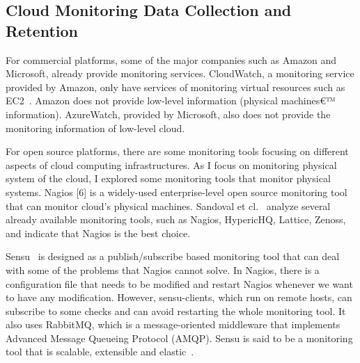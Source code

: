 \subsection{Cloud Monitoring Data Collection and Retention}

For commercial platforms, some of the major companies such as Amazon and Microsoft, already provide monitoring services. CloudWatch, a monitoring service provided by Amazon, only have services of monitoring virtual resources such as EC2~\cite{Aceto2013}. Amazon does not provide low-level information (physical machines€™ information). AzureWatch, provided by Microsoft, also does not provide the monitoring information of low-level cloud. 

  For open source platforms, there are some monitoring tools focusing on different aspects of cloud computing infrastructures. As I focus on monitoring physical system of the cloud, I explored some monitoring tools that monitor physical systems. Nagios [6] is a widely-used enterprise-level open source monitoring tool that can monitor cloud's physical machines. Sandoval et cl.~\cite{sandoval2012evaluation} analyze several already available monitoring tools, such as Nagios, HypericHQ, Lattice, Zenoss, and indicate that Nagios is the best choice. 

  Sensu~\cite{sensu} is designed as a publish/subscribe based monitoring tool that can deal with some of the problems that Nagios cannot solve. In Nagios, there is a configuration file that needs to be modified and restart Nagios whenever we want to have any modification. However, sensu-clients, which run on remote hosts, can subscribe to some checks and can avoid restarting the whole monitoring tool. It also uses RabbitMQ, which is a message-oriented middleware that implements Advanced Message Queueing Protocol (AMQP). Sensu is said to be a monitoring tool that is scalable, extensible and elastic~\cite{Aceto2013}. 